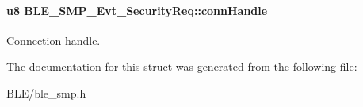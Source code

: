 \paragraph[{\texorpdfstring{conn\+Handle}{connHandle}}]{\setlength{\rightskip}{0pt plus 5cm}u8 B\+L\+E\+\_\+\+S\+M\+P\+\_\+\+Evt\+\_\+\+Security\+Req\+::conn\+Handle}\hypertarget{struct_b_l_e___s_m_p___evt___security_req_af2860c3b34e1627fb405397634d9dc3b}{}\label{struct_b_l_e___s_m_p___evt___security_req_af2860c3b34e1627fb405397634d9dc3b}
Connection handle. 

The documentation for this struct was generated from the following file\+:\begin{DoxyCompactItemize}
\item 
B\+L\+E/ble\+\_\+smp.\+h\end{DoxyCompactItemize}
